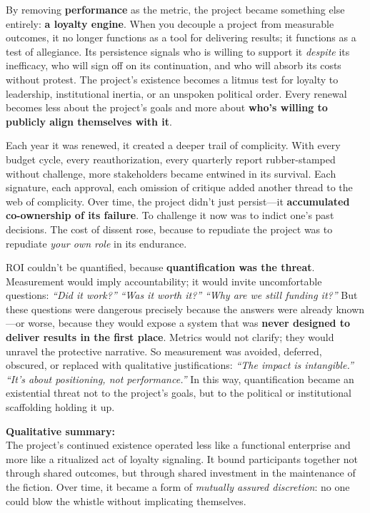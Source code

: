 By removing \textbf{performance} as the metric, the project became something else entirely: \textbf{a loyalty engine}. When you decouple a project from measurable outcomes, it no longer functions as a tool for delivering results; it functions as a test of allegiance. Its persistence signals who is willing to support it \emph{despite} its inefficacy, who will sign off on its continuation, and who will absorb its costs without protest. The project’s existence becomes a litmus test for loyalty to leadership, institutional inertia, or an unspoken political order. Every renewal becomes less about the project’s goals and more about \textbf{who’s willing to publicly align themselves with it}.

\medskip

Each year it was renewed, it created a deeper trail of complicity. With every budget cycle, every reauthorization, every quarterly report rubber-stamped without challenge, more stakeholders became entwined in its survival. Each signature, each approval, each omission of critique added another thread to the web of complicity. Over time, the project didn’t just persist—it \textbf{accumulated co-ownership of its failure}. To challenge it now was to indict one’s past decisions. The cost of dissent rose, because to repudiate the project was to repudiate \emph{your own role} in its endurance.

\medskip

ROI couldn’t be quantified, because \textbf{quantification was the threat}. Measurement would imply accountability; it would invite uncomfortable questions: \emph{“Did it work?”} \emph{“Was it worth it?”} \emph{“Why are we still funding it?”} But these questions were dangerous precisely because the answers were already known—or worse, because they would expose a system that was \textbf{never designed to deliver results in the first place}. Metrics would not clarify; they would unravel the protective narrative. So measurement was avoided, deferred, obscured, or replaced with qualitative justifications: \emph{“The impact is intangible.”} \emph{“It’s about positioning, not performance.”} In this way, quantification became an existential threat not to the project’s goals, but to the political or institutional scaffolding holding it up.

\medskip

\noindent
\textbf{Qualitative summary:} \\
The project’s continued existence operated less like a functional enterprise and more like a ritualized act of loyalty signaling. It bound participants together not through shared outcomes, but through shared investment in the maintenance of the fiction. Over time, it became a form of \emph{mutually assured discretion}: no one could blow the whistle without implicating themselves.

